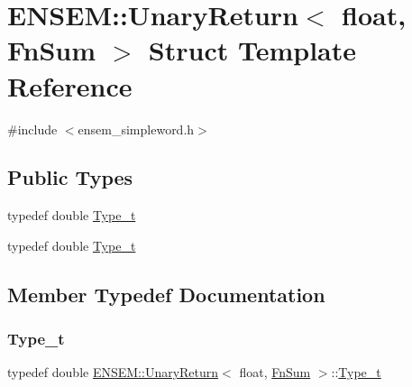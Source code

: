 \hypertarget{structENSEM_1_1UnaryReturn_3_01float_00_01FnSum_01_4}{}\section{E\+N\+S\+EM\+:\+:Unary\+Return$<$ float, Fn\+Sum $>$ Struct Template Reference}
\label{structENSEM_1_1UnaryReturn_3_01float_00_01FnSum_01_4}


{\ttfamily \#include $<$ensem\+\_\+simpleword.\+h$>$}

\subsection*{Public Types}
\begin{DoxyCompactItemize}
\item 
typedef double \mbox{\hyperlink{structENSEM_1_1UnaryReturn_3_01float_00_01FnSum_01_4_a0cb79ec09e03be62cf6790bcbd3d89c3}{Type\+\_\+t}}
\item 
typedef double \mbox{\hyperlink{structENSEM_1_1UnaryReturn_3_01float_00_01FnSum_01_4_a0cb79ec09e03be62cf6790bcbd3d89c3}{Type\+\_\+t}}
\end{DoxyCompactItemize}


\subsection{Member Typedef Documentation}
\mbox{\label{structENSEM_1_1UnaryReturn_3_01float_00_01FnSum_01_4_a0cb79ec09e03be62cf6790bcbd3d89c3}} 
\subsubsection{\texorpdfstring{Type\_t}{Type\_t}\hspace{0.1cm}{\footnotesize\ttfamily [1/2]}}
{\footnotesize\ttfamily typedef double \mbox{\hyperlink{structENSEM_1_1UnaryReturn}{E\+N\+S\+E\+M\+::\+Unary\+Return}}$<$ float, \mbox{\hyperlink{structENSEM_1_1FnSum}{Fn\+Sum}} $>$\+::\mbox{\hyperlink{structENSEM_1_1UnaryReturn_3_01float_00_01FnSum_01_4_a0cb79ec09e03be62cf6790bcbd3d89c3}{Type\+\_\+t}}}

\mbox{\label{structENSEM_1_1UnaryReturn_3_01float_00_01FnSum_01_4_a0cb79ec09e03be62cf6790bcbd3d89c3}} 

